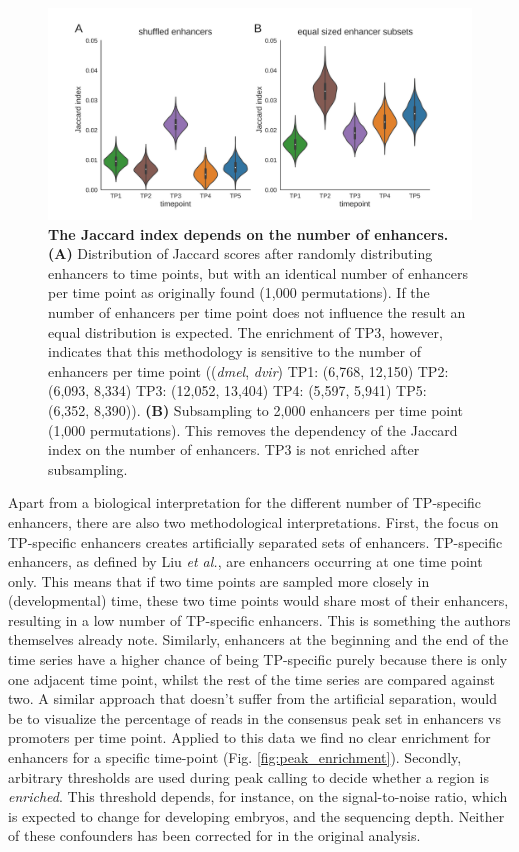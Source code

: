 \begin{figure}
    \includegraphics[width=\linewidth]{ch.hourglass/images/fly_shuffle.png}
    \caption{\textbf{The Jaccard index depends on the number of enhancers.} \textbf{(A)} Distribution of Jaccard scores after randomly distributing enhancers to time points, but with an identical number of enhancers per time point as originally found (1,000 permutations). If the number of enhancers per time point does not influence the result an equal distribution is expected. The enrichment of TP3, however, indicates that this methodology is sensitive to the number of enhancers per time point ((\textit{dmel}, \textit{dvir}) TP1: (6,768, 12,150) TP2: (6,093, 8,334) TP3: (12,052, 13,404) TP4: (5,597, 5,941) TP5: (6,352, 8,390)). \textbf{(B)} Subsampling to 2,000 enhancers per time point (1,000 permutations). This removes the dependency of the Jaccard index on the number of enhancers. TP3 is not enriched after subsampling.}
    \label{fig:shuffle}
\end{figure}

Apart from a biological interpretation for the different number of TP-specific enhancers, there are also two methodological interpretations. First, the focus on TP-specific enhancers creates artificially separated sets of enhancers. TP-specific enhancers, as defined by Liu \textit{et al.}, are enhancers occurring at one time point only. This means that if two time points are sampled more closely in (developmental) time, these two time points would share most of their enhancers, resulting in a low number of TP-specific enhancers. This is something the authors themselves already note. Similarly, enhancers at the beginning and the end of the time series have a higher chance of being TP-specific purely because there is only one adjacent time point, whilst the rest of the time series are compared against two. A similar approach that doesn't suffer from the artificial separation, would be to visualize the percentage of reads in the consensus peak set in enhancers vs promoters per time point. Applied to this data we find no clear enrichment for enhancers for a specific time-point (Fig. \ref{fig:peak_enrichment}). Secondly, arbitrary thresholds are used during peak calling to decide whether a region is \textit{enriched}. This threshold depends, for instance, on the signal-to-noise ratio, which is expected to change for developing embryos, and the sequencing depth\cite{encode_guidelines2012}. Neither of these confounders has been corrected for in the original analysis.

